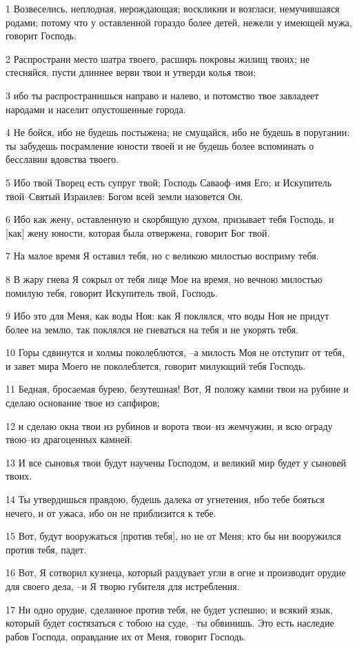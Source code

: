 \par 1 Возвеселись, неплодная, нерождающая; воскликни и возгласи, немучившаяся родами; потому что у оставленной гораздо более детей, нежели у имеющей мужа, говорит Господь.
\par 2 Распространи место шатра твоего, расширь покровы жилищ твоих; не стесняйся, пусти длиннее верви твои и утверди колья твои;
\par 3 ибо ты распространишься направо и налево, и потомство твое завладеет народами и населит опустошенные города.
\par 4 Не бойся, ибо не будешь постыжена; не смущайся, ибо не будешь в поругании: ты забудешь посрамление юности твоей и не будешь более вспоминать о бесславии вдовства твоего.
\par 5 Ибо твой Творец есть супруг твой; Господь Саваоф--имя Его; и Искупитель твой--Святый Израилев: Богом всей земли назовется Он.
\par 6 Ибо как жену, оставленную и скорбящую духом, призывает тебя Господь, и [как] жену юности, которая была отвержена, говорит Бог твой.
\par 7 На малое время Я оставил тебя, но с великою милостью восприму тебя.
\par 8 В жару гнева Я сокрыл от тебя лице Мое на время, но вечною милостью помилую тебя, говорит Искупитель твой, Господь.
\par 9 Ибо это для Меня, как воды Ноя: как Я поклялся, что воды Ноя не придут более на землю, так поклялся не гневаться на тебя и не укорять тебя.
\par 10 Горы сдвинутся и холмы поколеблются, --а милость Моя не отступит от тебя, и завет мира Моего не поколеблется, говорит милующий тебя Господь.
\par 11 Бедная, бросаемая бурею, безутешная! Вот, Я положу камни твои на рубине и сделаю основание твое из сапфиров;
\par 12 и сделаю окна твои из рубинов и ворота твои--из жемчужин, и всю ограду твою--из драгоценных камней.
\par 13 И все сыновья твои будут научены Господом, и великий мир будет у сыновей твоих.
\par 14 Ты утвердишься правдою, будешь далека от угнетения, ибо тебе бояться нечего, и от ужаса, ибо он не приблизится к тебе.
\par 15 Вот, будут вооружаться [против тебя], но не от Меня; кто бы ни вооружился против тебя, падет.
\par 16 Вот, Я сотворил кузнеца, который раздувает угли в огне и производит орудие для своего дела, --и Я творю губителя для истребления.
\par 17 Ни одно орудие, сделанное против тебя, не будет успешно; и всякий язык, который будет состязаться с тобою на суде, --ты обвинишь. Это есть наследие рабов Господа, оправдание их от Меня, говорит Господь.

